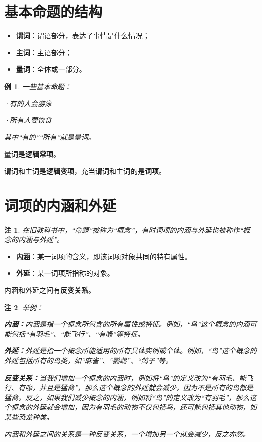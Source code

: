 \documentclass[12pt,onecolumn,a4paper]{book}
\newtheorem*{example}{例}
\newtheorem*{note}{注}
\numberwithin{table}{subsection}
\numberwithin{equation}{subsection}
\begin{document}
\section{基本命题的结构}

\begin{itemize}[itemsep=0pt,parsep=0pt]
    \item \textbf{谓词}：谓语部分，表达了事情是什么情况；
    \item \textbf{主词}：主语部分；
    \item \textbf{量词}：全体或一部分。
\end{itemize}

\begin{example}
    一些基本命题：

    ·有的人会游泳

    ·所有人要饮食

    其中“有的”“所有”就是量词。
\end{example}

量词是\textbf{逻辑常项}。

谓词和主词是\textbf{逻辑变项}，充当谓词和主词的是\textbf{词项}。

\section{词项的内涵和外延}

\begin{note}
    在旧教科书中，“命题”被称为“概念”，有时词项的内涵与外延也被称作“概念的内涵与外延”。
\end{note}

\begin{itemize}[itemsep=0pt,parsep=0pt]
    \item \textbf{内涵}：某一词项的含义，即该词项对象共同的特有属性。
    \item \textbf{外延}：某一词项所指称的对象。
\end{itemize}

内涵和外延之间有\textbf{反变关系}。

\begin{note}
    举例：

    \textbf{内涵：}内涵是指一个概念所包含的所有属性或特征。例如，“鸟”这个概念的内涵可能包括“有羽毛”、“能飞行”、“有喙”等特征。

    \textbf{外延：}外延是指一个概念所能适用的所有具体实例或个体。例如，“鸟”这个概念的外延包括所有的鸟类，如“麻雀”、“鹦鹉”、“鸽子”等。

    \textbf{反变关系：}当我们增加一个概念的内涵时，例如将“鸟”的定义改为“有羽毛、能飞行、有喙，并且是猛禽”，那么这个概念的外延就会减少，因为不是所有的鸟都是猛禽。反之，如果我们减少概念的内涵，例如将“鸟”的定义改为“有羽毛”，那么这个概念的外延就会增加，因为有羽毛的动物不仅包括鸟，还可能包括其他动物，如某些恐龙种类。

    内涵和外延之间的关系是一种反变关系，一个增加另一个就会减少，反之亦然。
\end{note}
\end{document}
